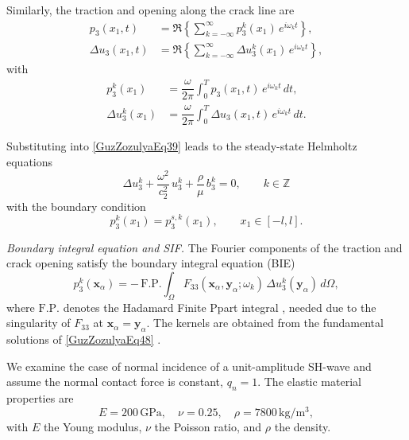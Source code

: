 Similarly, the traction and opening along the crack line are
\begin{equation}\label{GuzZozulyaEq46}
	\begin{aligned}
		p_3(x_1,t)
		&= \Re\left\{\sum_{k=-\infty}^{\infty} p_3^k(x_1)\,e^{i\omega_k t} \right\},\\
		\Delta u_3(x_1,t)
		&= \Re\left\{\sum_{k=-\infty}^{\infty} \Delta u_3^k(x_1)\,e^{i\omega_k t} \right\},
	\end{aligned}
\end{equation}
with
\begin{equation}\label{GuzZozulyaEq47}
	\begin{array}{ll}
		p_3^k(x_1)
		&= \dfrac{\omega}{2\pi}\displaystyle\int_0^T p_3(x_1,t)\,e^{i\omega_k t}\,dt,\\
		\Delta u_3^k(x_1)
		&= \dfrac{\omega}{2\pi}\displaystyle\int_0^T \Delta u_3(x_1,t)\,e^{i\omega_k t}\,dt.
	\end{array}
\end{equation}

Substituting into \eqref{GuzZozulyaEq39} leads to the steady-state
Helmholtz equations
\begin{equation}\label{GuzZozulyaEq48}
	\Delta u_3^k
	+ \frac{\omega^2}{c_2^2}\,u_3^k
	+ \frac{\rho}{\mu}\,b_3^k
	= 0,
	\qquad k \in \mathbb{Z}
\end{equation}
with the boundary condition
\begin{equation}\label{GuzZozulyaEq49}
	p_3^k(x_1) = p_3^{s,k}(x_1),
	\qquad x_1\in[-l,l].
\end{equation}

\medskip
\emph{Boundary integral equation and SIF.} The Fourier components of the traction and crack opening satisfy the
boundary integral equation (BIE)
\begin{equation}\label{GuzZozulyaEq50}
	p_3^k(\mathbf{x}_\alpha)
	= -\,\mathrm{F.P.}\!
	\int_{\Omega}
	F_{33}(\mathbf{x}_\alpha,\mathbf{y}_\alpha;\omega_k)\,
	\Delta u_3^k(\mathbf{y}_\alpha)\,d\Omega,
\end{equation}
where $\mathrm{F.P.}$ denotes the Hadamard Finite Ppart integral ,
needed due to the singularity of $F_{33}$ at
$\mathbf{x}_\alpha=\mathbf{y}_\alpha$.  
The kernels are obtained from the fundamental solutions of
\eqref{GuzZozulyaEq48} 
\cite{GuzZozulyaRef3,GuzZozulyaRef8,GuzZozulyaRef31,GuzZozulyaRef9}.

We examine the case of normal incidence of a unit-amplitude SH-wave and assume
the normal contact force is constant, $q_n=1$.  
The elastic material properties are
\[
E = 200\,\mathrm{GPa}, \quad
\nu = 0.25, \quad
\rho = 7800\,\mathrm{kg/m^3},
\]
with $E$ the Young modulus, $\nu$ the Poisson ratio, and $\rho$ the density.

